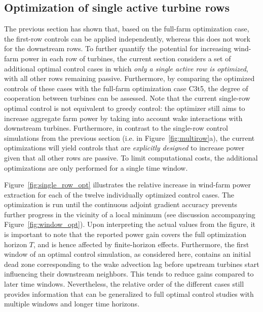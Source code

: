 	\subsection{Optimization of single active turbine rows}\label{sec:optimization_single}
	The previous section has shown that, based on the full-farm optimization case, the first-row controls can be applied independently, whereas this does not work for the downstream rows. To further quantify the potential for increasing wind-farm power in each row of turbines, the current section considers a set of additional optimal control cases in which \emph{only a single active row is optimized}, with all other rows remaining passive. Furthermore, by comparing the optimized controls of these cases with the full-farm optimization case C3t5, the degree of cooperation between turbines can be assessed. Note that the current single-row optimal control is not equivalent to greedy control: the optimizer still aims to increase aggregate farm power by taking into account wake interactions with downstream turbines. Furthermore, in contrast to the single-row control simulations from the previous section (i.e. in Figure~\ref{fig:multirow}a), the current optimizations will yield controls that are \emph{explicitly designed} to increase power given that all other rows are passive. To limit computational costs, the additional optimizations are only performed for a single time window. 
	
	Figure~\ref{fig:single_row_opt} illustrates the relative increase in wind-farm power extraction for each of the twelve individually optimized control cases. The optimization is run until the continuous adjoint gradient accuracy prevents further progress in the vicinity of a local minimum (see discussion accompanying Figure~\ref{fig:window_opt}). Upon interpreting the actual values from the figure, it is important to note that the reported power gain covers the full optimization horizon $T$, and is hence affected by finite-horizon effects. Furthermore, the first window of an optimal control simulation, as considered here, contains an initial dead zone corresponding to the wake advection lag before upstream turbines start influencing their downstream neighbors. This tends to reduce gains compared to later time windows. Nevertheless, the relative order of the different cases still provides information that can be generalized to full optimal control studies with multiple windows and longer time horizons. 
	
